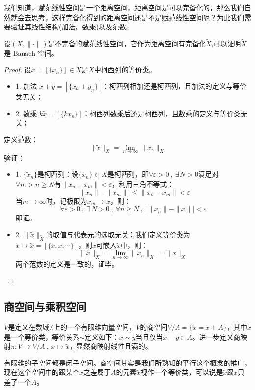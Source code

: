 我们知道，赋范线性空间是一个距离空间，距离空间是可以完备化的，那么我们自然就会去思考，这样完备化得到的距离空间还是不是赋范线性空间呢？为此我们需要验证其线性结构(加法，数乘)以及范数。
\begin{theorem}
    设$(X,\|\cdot\|)$是不完备的赋范线性空间，它作为距离空间有完备化$\tilde{X}$,可以证明$\tilde{X}$是 Banach 空间。
\end{theorem}
\begin{proof}
设$\tilde{x}=[\{x_n\}] \in \tilde{X}$是$X$中柯西列的等价类。
\begin{itemize}
\item 1. 加法 $\tilde{x}+\tilde{y}=[\{x_n+y_n\}]$：柯西列相加还是柯西列，且加法的定义与等价类无关；
\item 2. 数乘 $k\tilde{x}=[\{kx_n\}]$：柯西列数乘后还是柯西列，且数乘的定义与等价类无关；
\end{itemize}
定义范数：
\[\|\tilde{x}\|_{\tilde{X}}=\lim_{n \to \infty}\|x_n\|_X\]
验证：
\begin{itemize}
\item 1. $\{\tilde{x}_n\}$是柯西列：设$\{x_n\} \subset X$是柯西列，即$\forall \varepsilon>0 \ , \ \exists \, N>0$满足对$\forall m>n \geq N$有$\|x_n-x_m\|<\varepsilon$，利用三角不等式：
$$\left| \|x_n\|-\|x_m\| \right| \leq \|x_n-x_m\|<\varepsilon$$
当$m \to \infty$时，记极限为$x_m \to x$，则：
$$\forall \varepsilon>0 \ , \ \exists \, N>0 \ , \ \forall n \geq N \ , \ \left| \|x_n\|-\|x\| \right|<\varepsilon$$
即证。
\item 2. $\|\tilde{x}\|_{\tilde{X}}$的取值与代表元的选取无关：我们定义等价类为$x \mapsto \tilde{x}=[\{x,x,\cdots\}]$，则$x$可嵌入$\tilde{x}$中，则：
\[\|\tilde{x}\|_{\tilde{X}}=\lim_{n \to \infty}\|x_n\|_X=\|x\|_X\]
两个范数的定义是一致的，证毕。
\end{itemize}
\end{proof}

\newpage
\subsection{商空间与乘积空间}
\begin{definition}[有限维商空间]
$V$是定义在数域$\mathbb{K}$上的一个有限维向量空间，$V$的商空间$V/A=\{\tilde{x}=x+A\}$，其中$\tilde{x}$是一个等价类，等价关系$\sim$定义如下：$x \sim y$当且仅当$x-y \in A$。进一步定义商映射$\pi:V \to V/A \ , \ x \mapsto \tilde{x}$，显然商映射线性且满的。
\end{definition}
有限维的子空间都是闭子空间。商空间其实是我们所熟知的平行这个概念的推广，现在这个空间中的跟某个$x$之差属于$A$的元素$\tilde{x}$视作一个等价类，可以说是$\tilde{x}$跟$x$只差了一个$A$。

